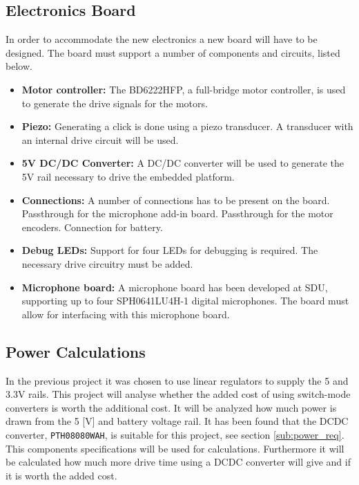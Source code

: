 \subsection{Electronics Board} %
\label{sub:electronics_board}
In order to accommodate the new electronics a new board will have to be designed.
The board must support a number of components and circuits, listed below.
\begin{itemize}
	\item \textbf{Motor controller:} The BD6222HFP, a full-bridge motor controller, is used to generate the drive signals for the motors.
	\item \textbf{Piezo:} Generating a click is done using a piezo transducer.
	A transducer with an internal drive circuit will be used.
	\item \textbf{5V DC/DC Converter:} A DC/DC converter will be used to generate the 5V rail necessary to drive the embedded platform.
	\item \textbf{Connections:} A number of connections has to be present on the board.
	Passthrough for the microphone add-in board.
	Passthrough for the motor encoders.
	Connection for battery.
	\item \textbf{Debug LEDs:} Support for four LEDs for debugging is required.
	The necessary drive circuitry must be added.
	\item \textbf{Microphone board:} A microphone board has been developed at SDU, supporting up to four SPH0641LU4H-1 digital microphones. The board must allow for interfacing with this microphone board.
\end{itemize}

\subsection{Power Calculations} %
\label{sub:power_calculations}
In the previous project it was chosen to use linear regulators to supply the 5 and 3.3V rails.
This project will analyse whether the added cost of using switch-mode converters is worth the additional cost.
It will be analyzed how much power is drawn from the 5 [V] and battery voltage rail.
It has been found that the DCDC converter, \texttt{PTH08080WAH}, is suitable for this project, see section \ref{sub:power_req}.
This components specifications will be used for calculations. 
Furthermore it will be calculated how much more drive time using a DCDC converter will give and if it is worth the added cost. 


